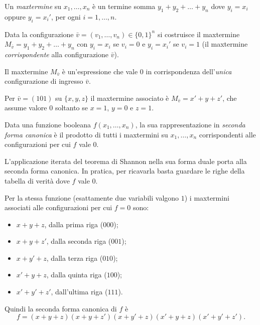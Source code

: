 \documentclass[11pt,a4paper]{article}
\begin{document}
\begin{definizione}[Maxtermine]
Un \emph{maxtermine} su $x_1, \dots, x_n$ è un termine somma
$y_1 + y_2 + \dots + y_n$ dove $y_i = x_i$ oppure $y_i = x_i'$, per ogni
$i = 1, \dots, n$.

Data la configurazione $\bar{v} = (v_1, \dots, v_n) \in \{0,1\}^n$ si costruisce
il maxtermine $M_{\bar{v}} = y_1 + y_2 + \dots + y_n$ con $y_i = x_i$ se
$v_i = 0$ e $y_i = x_i'$ se $v_i = 1$ (il maxtermine \emph{corrispondente} alla
configurazione $\bar{v}$).
\end{definizione}

Il maxtermine $M_{\bar{v}}$ è un'espressione che vale $0$ in corrispondenza
dell'\emph{unica} configurazione di ingresso $\bar{v}$.

\begin{esempio}
Per $\bar{v} = (101)$ su $\{x,y,z\}$ il maxtermine associato è
$M_{\bar{v}} = x' + y + z'$, che assume valore $0$ soltanto se $x = 1$,
$y = 0$ e $z = 1$.
\end{esempio}

\begin{definizione}
Data una funzione booleana $f(x_1, \dots, x_n)$, la sua rappresentazione in
\emph{seconda forma canonica} è il prodotto di tutti i maxtermini su
$x_1, \dots, x_n$ corrispondenti alle configurazioni per cui $f$ vale $0$.
\end{definizione}

L'applicazione iterata del teorema di Shannon nella sua forma duale porta alla
seconda forma canonica. In pratica, per ricavarla basta guardare le righe della
tabella di verità dove $f$ vale $0$.

\begin{esempio}
Per la stessa funzione (esattamente due variabili valgono $1$) i maxtermini
associati alle configurazioni per cui $f = 0$ sono:
\begin{itemize}
    \item $x + y + z$, dalla prima riga ($000$);
    \item $x + y + z'$, dalla seconda riga ($001$);
    \item $x + y' + z$, dalla terza riga ($010$);
    \item $x' + y + z$, dalla quinta riga ($100$);
    \item $x' + y' + z'$, dall'ultima riga ($111$).
\end{itemize}
Quindi la seconda forma canonica di $f$ è
\[
  f = (x + y + z)(x + y + z')(x + y' + z)(x' + y + z)(x' + y' + z') .
\]
\end{esempio}
\end{document}
